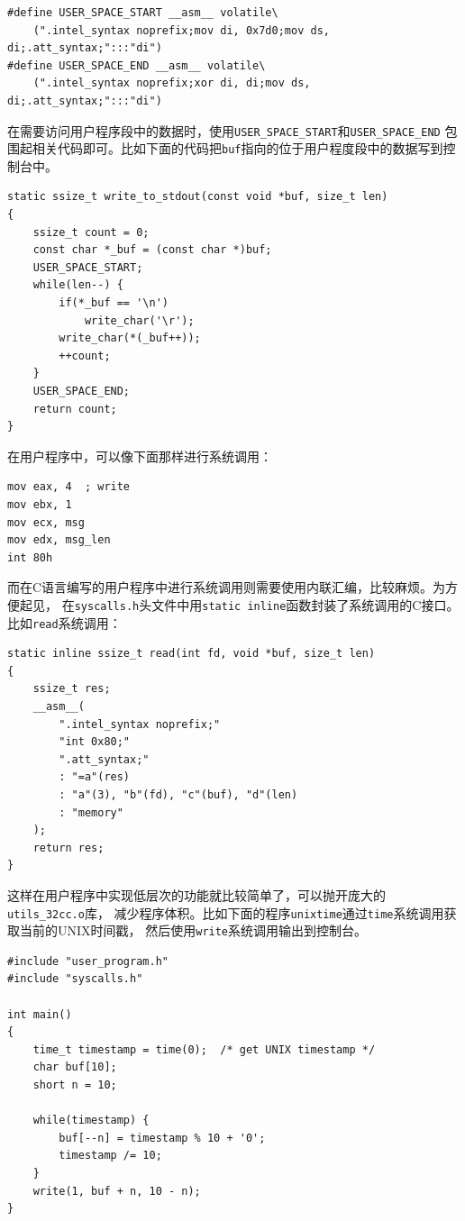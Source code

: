 \documentclass[adobefonts, a4paper]{ctexart}
\begin{document}
\begin{verbatim}
#define USER_SPACE_START __asm__ volatile\
    (".intel_syntax noprefix;mov di, 0x7d0;mov ds, di;.att_syntax;":::"di")
#define USER_SPACE_END __asm__ volatile\
    (".intel_syntax noprefix;xor di, di;mov ds, di;.att_syntax;":::"di")
\end{verbatim}

在需要访问用户程序段中的数据时，使用\verb|USER_SPACE_START|和\verb|USER_SPACE_END|
包围起相关代码即可。比如下面的代码把\verb|buf|指向的位于用户程度段中的数据写到控制台中。

\begin{verbatim}
static ssize_t write_to_stdout(const void *buf, size_t len)
{
    ssize_t count = 0;
    const char *_buf = (const char *)buf;
    USER_SPACE_START;
    while(len--) {
        if(*_buf == '\n')
            write_char('\r');
        write_char(*(_buf++));
        ++count;
    }
    USER_SPACE_END;
    return count;
}
\end{verbatim}

在用户程序中，可以像下面那样进行系统调用：

\begin{verbatim}
mov eax, 4  ; write
mov ebx, 1
mov ecx, msg
mov edx, msg_len
int 80h
\end{verbatim}

而在C语言编写的用户程序中进行系统调用则需要使用内联汇编，比较麻烦。为方便起见，
在\verb|syscalls.h|头文件中用\verb|static inline|函数封装了系统调用的C接口。
比如\verb|read|系统调用：

\begin{verbatim}
static inline ssize_t read(int fd, void *buf, size_t len)
{
    ssize_t res;
    __asm__(
        ".intel_syntax noprefix;"
        "int 0x80;"
        ".att_syntax;"
        : "=a"(res)
        : "a"(3), "b"(fd), "c"(buf), "d"(len)
        : "memory"
    );
    return res;
}
\end{verbatim}

这样在用户程序中实现低层次的功能就比较简单了，可以抛开庞大的\verb|utils_32cc.o|库，
减少程序体积。比如下面的程序\verb|unixtime|通过\verb|time|系统调用获取当前的UNIX时间戳，
然后使用\verb|write|系统调用输出到控制台。

\begin{verbatim}
#include "user_program.h"
#include "syscalls.h"

int main()
{
    time_t timestamp = time(0);  /* get UNIX timestamp */
    char buf[10];
    short n = 10;

    while(timestamp) {
        buf[--n] = timestamp % 10 + '0';
        timestamp /= 10;
    }
    write(1, buf + n, 10 - n);
}
\end{verbatim}
\end{document}
